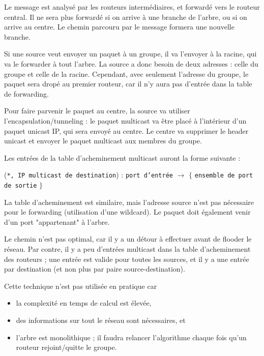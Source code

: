 		Le message est analysé par les routeurs intermédiaires, et forwardé vers le routeur central. Il ne sera plus forwardé si on arrive à une branche de l'arbre, ou si on arrive au centre. Le chemin parcouru par le message formera une nouvelle branche.
		
				
		Si une source veut envoyer un paquet à un groupe, il va l'envoyer à la racine, qui va le forwarder à tout l'arbre. La source a donc besoin de deux adresses : celle du groupe et celle de la racine. Cependant, avec seulement l'adresse du groupe, le paquet sera dropé au premier routeur, car il n'y aura pas d'entrée dans la table de forwarding.
		
		
		Pour faire parvenir le paquet au centre, la source va utiliser l'encapsulation/tunneling : le paquet multicast va être placé à l'intérieur d'un paquet unicast IP, qui sera envoyé au centre. Le centre va supprimer le header unicast et envoyer le paquet multicast aux membres du groupe.
		
		
		Les entrées de la table d'acheminement multicast auront la forme suivante :
		
		\begin{center}
	(\texttt{*, IP multicast de destination}) : \texttt{port d'entrée} $\rightarrow$ $\lbrace$ \texttt{ensemble de port de sortie} $\rbrace$
\end{center}
		
		La table d'acheminement est similaire, mais l'adresse source n'est pas nécessaire pour le forwarding (utilisation d'une wildcard). Le paquet doit également venir d'un port "appartenant" à l'arbre.
		
		Le chemin n'est pas optimal, car il y a un détour à effectuer avant de flooder le réseau. Par contre, il y a peu d'entrées multicast dans la table d'acheminement des routeurs ; une entrée est valide pour toutes les sources, et il y a une entrée par destination (et non plus par paire source-destination).
		
		Cette technique n'est pas utilisée en pratique car
		
		\begin{itemize}
			\item la complexité en temps de calcul est élevée,
			\item des informations sur tout le réseau sont nécessaires, et
			\item l'arbre est monolithique ; il faudra relancer l'algorithme chaque fois qu'un routeur rejoint/quitte le groupe.
		\end{itemize}
		
